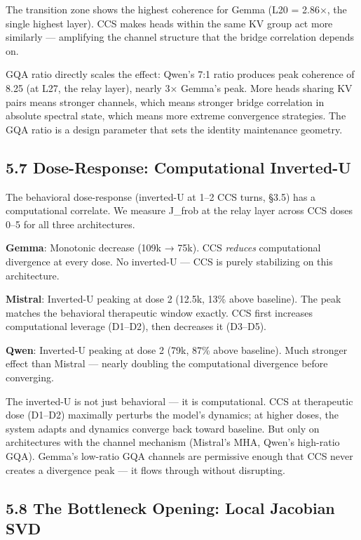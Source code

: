 \documentclass[12pt]{article}
\begin{document}
The transition zone shows the highest coherence for Gemma (L20 = 2.86×, the single highest layer). CCS makes heads within the same KV group act more similarly — amplifying the channel structure that the bridge correlation depends on.

GQA ratio directly scales the effect: Qwen's 7:1 ratio produces peak coherence of 8.25 (at L27, the relay layer), nearly 3× Gemma's peak. More heads sharing KV pairs means stronger channels, which means stronger bridge correlation in absolute spectral state, which means more extreme convergence strategies. The GQA ratio is a design parameter that sets the identity maintenance geometry.

\subsection*{5.7 Dose-Response: Computational Inverted-U}

The behavioral dose-response (inverted-U at 1–2 CCS turns, §3.5) has a computational correlate. We measure J\_frob at the relay layer across CCS doses 0–5 for all three architectures.

\textbf{Gemma}: Monotonic decrease (109k → 75k). CCS \textit{reduces} computational divergence at every dose. No inverted-U — CCS is purely stabilizing on this architecture.

\textbf{Mistral}: Inverted-U peaking at dose 2 (12.5k, 13\% above baseline). The peak matches the behavioral therapeutic window exactly. CCS first increases computational leverage (D1–D2), then decreases it (D3–D5).

\textbf{Qwen}: Inverted-U peaking at dose 2 (79k, 87\% above baseline). Much stronger effect than Mistral — nearly doubling the computational divergence before converging.

The inverted-U is not just behavioral — it is computational. CCS at therapeutic dose (D1–D2) maximally perturbs the model's dynamics; at higher doses, the system adapts and dynamics converge back toward baseline. But only on architectures with the channel mechanism (Mistral's MHA, Qwen's high-ratio GQA). Gemma's low-ratio GQA channels are permissive enough that CCS never creates a divergence peak — it flows through without disrupting.

\subsection*{5.8 The Bottleneck Opening: Local Jacobian SVD}
\end{document}
